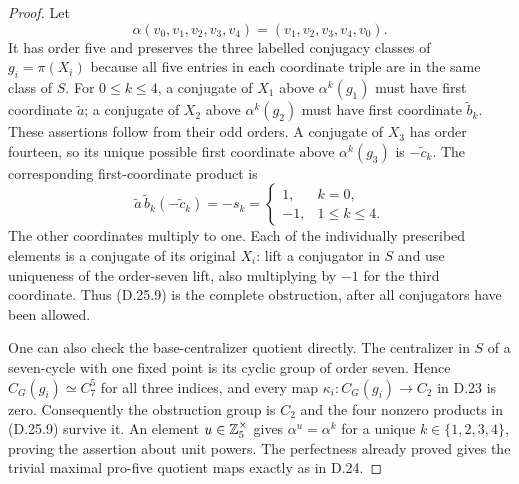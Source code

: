 \begin{proof}
Let
\[
 \alpha(v_0,v_1,v_2,v_3,v_4)=(v_1,v_2,v_3,v_4,v_0).
 \tag{D.25.8}
\]
It has order five and preserves the three labelled conjugacy
classes of $g_i=\pi(X_i)$ because all five entries in each
coordinate triple are in the same class of $S$.
For $0\leq k\leq4$, a conjugate of $X_1$ above
$\alpha^k(g_1)$ must have first coordinate $\widetilde a$;
a conjugate of $X_2$ above $\alpha^k(g_2)$ must have first
coordinate $\widetilde b_k$.  These assertions follow from
their odd orders.  A conjugate of $X_3$ has order fourteen,
so its unique possible first coordinate above
$\alpha^k(g_3)$ is $-\widetilde c_k$.
The corresponding first-coordinate product is
\[
 \widetilde a\,\widetilde b_k(-\widetilde c_k)
       =-s_k
       =\begin{cases}1,&k=0,\\-1,&1\leq k\leq4.
         \end{cases}
 \tag{D.25.9}
\]
The other coordinates multiply to one.  Each of the individually
prescribed elements is a conjugate of its original $X_i$:
lift a conjugator in $S$ and use uniqueness of the order-seven
lift, also multiplying by $-1$ for the third coordinate.
Thus \textup{(D.25.9)} is the complete obstruction, after all
conjugators have been allowed.

One can also check the base-centralizer quotient directly.
The centralizer in $S$ of a seven-cycle with one fixed point
is its cyclic group of order seven.  Hence
$C_G(g_i)\simeq C_7^5$ for all three indices, and every map
$\kappa_i:C_G(g_i)\to C_2$ in D.23 is zero.  Consequently
the obstruction group is $C_2$ and the four nonzero products
in \textup{(D.25.9)} survive it.  An element
$u\in\mathbb Z_5^\times$ gives $\alpha^u=\alpha^k$ for a unique
$k\in\{1,2,3,4\}$, proving the assertion about unit powers.
The perfectness already proved gives the trivial maximal
pro-five quotient maps exactly as in D.24.


\end{proof}
